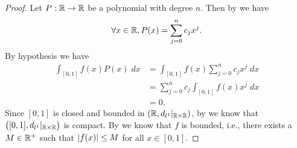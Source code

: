 \begin{proof}
  Let \(P : \mathbb{R} \to \mathbb{R}\) be a polynomial with degree \(n\).
  Then by  we have
  \[
    \forall x \in \mathbb{R}, P(x) = \sum_{j = 0}^n c_j x^j.
  \]
  By hypothesis we have
  \begin{align*}
    \int_{[0, 1]} f(x) P(x) \; dx & = \int_{[0, 1]} f(x) \sum_{j = 0}^n c_j x^j \; dx \\
                                  & = \sum_{j = 0}^n c_j \int_{[0, 1]} f(x) x^j \; dx \\
                                  & = 0.
  \end{align*}
  Since \([0, 1]\) is closed and bounded in \((\mathbb{R}, d_{l^1}|_{\mathbb{R} \times \mathbb{R}})\), by  we know that \(\big([0, 1], d_{l^1}|_{\mathbb{R} \times \mathbb{R}}\big)\) is compact.
  By  we know that \(f\) is bounded, i.e., there exists a \(M \in \mathbb{R}^+\) such that \(\left\lvert f(x)\right\rvert \leq M\) for all \(x \in [0, 1]\).


\end{proof}
